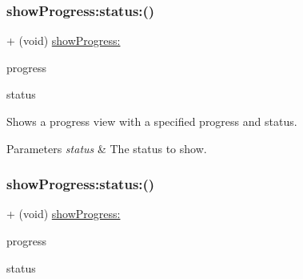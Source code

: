 \subsubsection{\texorpdfstring{show\+Progress\+:status\+:()}{showProgress:status:()}\hspace{0.1cm}{\footnotesize\ttfamily [2/3]}}
{\footnotesize\ttfamily + (void) \mbox{\hyperlink{interface_k_v_n_progress_abc53102e1cb121a8b38c3337ce372517}{show\+Progress\+:}} \begin{DoxyParamCaption}\item[{(C\+G\+Float)}]{progress }\item[{status:(N\+S\+String $\ast$)}]{status }\end{DoxyParamCaption}}

Shows a progress view with a specified {\ttfamily progress} and {\ttfamily status}. 
\begin{DoxyParams}{Parameters}
{\em status} & The status to show. \\
\hline
\end{DoxyParams}
\mbox{\label{interface_k_v_n_progress_a2c58c4d42f018ef3efbb163f6390004e}} 
\subsubsection{\texorpdfstring{show\+Progress\+:status\+:()}{showProgress:status:()}\hspace{0.1cm}{\footnotesize\ttfamily [3/3]}}
{\footnotesize\ttfamily + (void) \mbox{\hyperlink{interface_k_v_n_progress_abc53102e1cb121a8b38c3337ce372517}{show\+Progress\+:}} \begin{DoxyParamCaption}\item[{(C\+G\+Float)}]{progress }\item[{status:(N\+S\+String$\ast$)}]{status }\end{DoxyParamCaption}}

